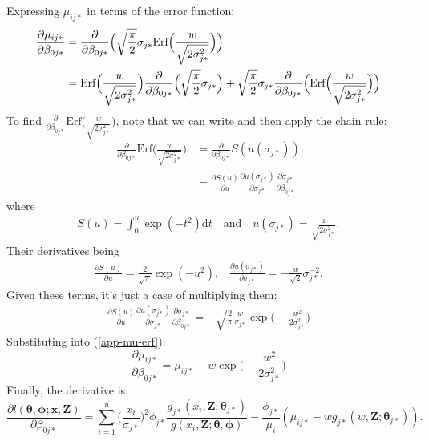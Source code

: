 \documentclass[useAMS,referee, usegraphicx]{biom}
\begin{document}
Expressing $\mu_{ij*}$ in terms of the error function:
\begin{align}
\frac{\partial \mu_{ij*}}{\partial \beta_{0j*}} &= \frac{\partial}{\partial \beta_{0j*}} \Big( \sqrt{\frac{\pi}{2}} \sigma_{j*} \text{Erf}\Big(\frac{w}{\sqrt{2\sigma_{j*}^2}}\Big) \Big) \notag \\
&= \text{Erf}\Big(\frac{w}{\sqrt{2\sigma_{j*}^2}}\Big) \frac{\partial}{\partial \beta_{0j*}} \Big( \sqrt{\frac{\pi}{2}} \sigma_{j*} \Big) + \sqrt{\frac{\pi}{2}} \sigma_{j*} \frac{\partial}{\partial \beta_{0j*}} \Big(\text{Erf}\Big(\frac{w}{\sqrt{2\sigma_{j*}^2}}\Big) \Big)\label{app-mu-erf}
\end{align}
To find $\frac{\partial}{\partial \beta_{0j*}} \text{Erf}\Big(\frac{w}{\sqrt{2\sigma_{j*}^2}}\Big)$, note that we can write and then apply the chain rule:
\begin{align*}
\frac{\partial}{\partial \beta_{0j*}} \text{Erf}\Big(\frac{w}{\sqrt{2\sigma_{j*}^2}}\Big) &= \frac{\partial}{\partial \beta_{0j*}} S(u(\sigma_{j*}))\\
&= \frac{\partial S(u)}{\partial u} \frac{\partial u(\sigma_{j*})}{\partial \sigma_{j*} } \frac{\partial \sigma_{j*}}{\partial \beta_{0j*}}
\end{align*}
where 
\begin{align*}
S(u) = \int_0^{u} \exp(-t^2) \text{d}t \quad \text{and} \quad u(\sigma_{j*})=\frac{w}{\sqrt{2\sigma_{j*}^2}}.
\end{align*}
Their derivatives being
\begin{align*}
\frac{\partial S(u)}{\partial u} = \frac{2}{\sqrt{\pi}} \exp(-u^2) \text{,} \quad \frac{\partial u(\sigma_{j*})}{\partial \sigma_{j*}} = -\frac{w}{\sqrt{2}}\sigma_{j*}^{-2}.
\end{align*}
Given these terms, it's just a case of multiplying them:
\begin{align*}
\frac{\partial S(u)}{\partial u} \frac{\partial u(\sigma_{j*})}{\partial \sigma_{j*} } \frac{\partial \sigma_{j*}}{\partial \beta_{0j*}} = - \sqrt{\frac{2}{\pi}} \frac{w}{\sigma_{j*}} \exp\Big( -\frac{w^2}{2\sigma_{j*}^2} \Big)
\end{align*}
Substituting into (\ref{app-mu-erf}):
\begin{equation*}
\frac{\partial \mu_{ij*}}{\partial \beta_{0j*}} =  \mu_{ij*} - w \exp\Big( -\frac{w^2}{2\sigma_{j*}^2} \Big)
\end{equation*}
Finally, the derivative is:
\begin{equation*}
\frac{\partial l(\bm{\theta}, \bm{\phi}; \mathbf{x},\mathbf{Z})}{\partial \beta_{0j*}} = \sum_{i=1}^n \Big( \frac{x_i}{\sigma_{j*}}\Big)^2 \phi_{j*} \frac{g_{j*}(x_i,\mathbf{Z}; \bm{\theta}_{j*})}{g(x_i,\mathbf{Z}; \bm{\theta},\bm{\phi})}  - \frac{\phi_{j*}}{\mu_i} (\mu_{ij*} - w g_{j*}(w,\mathbf{Z}; \bm{\theta}_{j*})).
\end{equation*}
\end{document}
